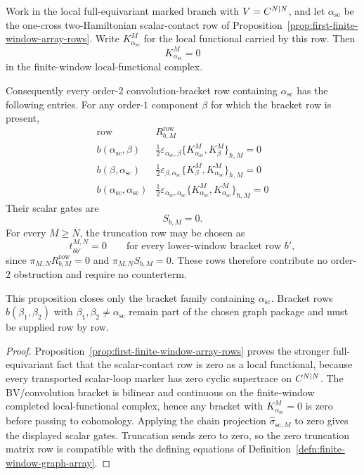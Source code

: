 \begin{prop}\label{prop:universal-scalar-contact-bracket-rows}
  Work in the local full-equivariant marked branch with \(V=C^{N|N}\), and
  let \(\alpha_{\mathrm{sc}}\) be the one-cross two-Hamiltonian
  scalar-contact row of
  Proposition~\ref{prop:first-finite-window-array-rows}.  Write
  \(K^M_{\alpha_{\mathrm{sc}}}\) for the local functional carried by this
  row.  Then
  \[
    K^M_{\alpha_{\mathrm{sc}}}=0
  \]
  in the finite-window local-functional complex.

  Consequently every order-\(2\) convolution-bracket row containing
  \(\alpha_{\mathrm{sc}}\) has the following entries.  For any order-\(1\)
  component \(\beta\) for which the bracket row is present,
  \[
  \begin{array}{c|c}
    \text{row} & R^{\mathrm{row}}_{b,M} \\ \hline
    b(\alpha_{\mathrm{sc}},\beta) &
      \frac12\varepsilon_{\alpha_{\mathrm{sc}},\beta}
      \{K^M_{\alpha_{\mathrm{sc}}},K^M_{\beta}\}_{\hbar,M}=0\\
    b(\beta,\alpha_{\mathrm{sc}}) &
      \frac12\varepsilon_{\beta,\alpha_{\mathrm{sc}}}
      \{K^M_{\beta},K^M_{\alpha_{\mathrm{sc}}}\}_{\hbar,M}=0\\
    b(\alpha_{\mathrm{sc}},\alpha_{\mathrm{sc}}) &
      \frac12\varepsilon_{\alpha_{\mathrm{sc}},\alpha_{\mathrm{sc}}}
      \{K^M_{\alpha_{\mathrm{sc}}},
        K^M_{\alpha_{\mathrm{sc}}}\}_{\hbar,M}=0
  \end{array}
  \]
  Their scalar gates are
  \[
    S_{b,M}=0.
  \]
  For every \(M\geq N\), the truncation row may be chosen as
  \[
    t^{M,N}_{b b'}=0
    \qquad
    \text{for every lower-window bracket row } b',
  \]
  since \(\pi_{M,N}R^{\mathrm{row}}_{b,M}=0\) and
  \(\pi_{M,N}S_{b,M}=0\).  These rows therefore contribute no order-\(2\)
  obstruction and require no counterterm.

  This proposition closes only the bracket family containing
  \(\alpha_{\mathrm{sc}}\).  Bracket rows \(b(\beta_1,\beta_2)\) with
  \(\beta_1,\beta_2\neq\alpha_{\mathrm{sc}}\) remain part of the chosen
  graph package and must be supplied row by row.
\end{prop}

\begin{proof}
  Proposition~\ref{prop:first-finite-window-array-rows} proves the stronger
  full-equivariant fact that the scalar-contact row is zero as a local
  functional, because every transported scalar-loop marker has zero cyclic
  supertrace on \(C^{N|N}\).  The BV/convolution bracket is bilinear and
  continuous on the finite-window completed local-functional complex, hence
  any bracket with \(K^M_{\alpha_{\mathrm{sc}}}=0\) is zero before passing to
  cohomology.  Applying the chain projection
  \(\widehat\sigma_{\mathrm{sc},M}\) to zero gives the displayed scalar
  gates.  Truncation sends zero to zero, so the zero truncation matrix row is
  compatible with the defining equations of
  Definition~\ref{defn:finite-window-graph-array}.
\end{proof}

